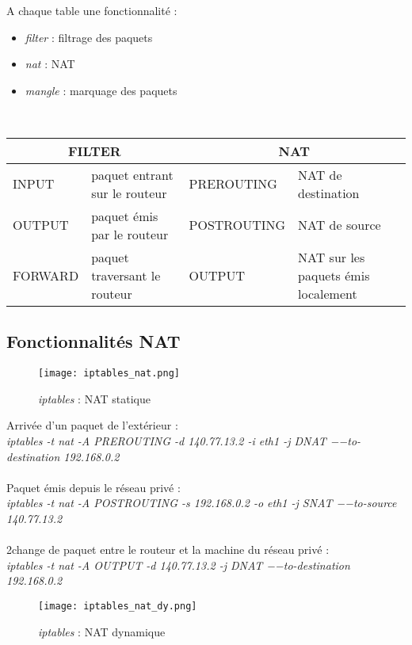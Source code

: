 \documentclass[journal, a4paper]{IEEEtran}
\begin{document}
A chaque table une fonctionnalité :
\begin{itemize}
	\item \textit{filter} : filtrage des paquets
	\item \textit{nat} : NAT
	\item \textit{mangle} : marquage des paquets
\end{itemize}
~\\
\begin{tabular}{|p{1.7cm}|p{1.9cm}|p{2.5cm}|p{1.9cm}|}
  \hline
  \multicolumn{2}{|c|}{\textsc{FILTER}} & \multicolumn{2}{c|}{\textsc{NAT}} \\
  \hline
  \textsc{INPUT} & paquet entrant sur le routeur & \textsc{PREROUTING} & NAT de destination \\
  \hline
  \textsc{OUTPUT} & paquet émis par le routeur & \textsc{POSTROUTING} & NAT de source \\
  \hline
  \textsc{FORWARD} & paquet traversant le routeur & \textsc{OUTPUT} & NAT sur les paquets émis localement \\
  \hline
\end{tabular}
\newpage
\subsection{Fonctionnalités NAT}

\begin{figure}[!hbt]
	\begin{center}
	\texttt{[image: iptables\_nat.png]}
	\caption{\textit{iptables} : NAT statique}
	\label{fig:iptables_nat}
	\end{center}
\end{figure}

Arrivée d'un paquet de l'extérieur :\\
\textit{iptables -t nat -A PREROUTING -d 140.77.13.2 -i eth1 -j DNAT −−to-destination 192.168.0.2}\\
~\\
Paquet émis depuis le réseau privé :\\
\textit{iptables -t nat -A POSTROUTING -s 192.168.0.2 -o eth1 -j SNAT −−to-source 140.77.13.2}\\
~\\
2change de paquet entre le routeur et la machine du réseau privé :\\
\textit{iptables -t nat -A OUTPUT -d 140.77.13.2 -j DNAT −−to-destination 192.168.0.2}

\begin{figure}[!hbt]
	\begin{center}
	\texttt{[image: iptables\_nat\_dy.png]}
	\caption{\textit{iptables} : NAT dynamique}
	\label{fig:iptables_nat_dy}
	\end{center}
\end{figure}
\end{document}
